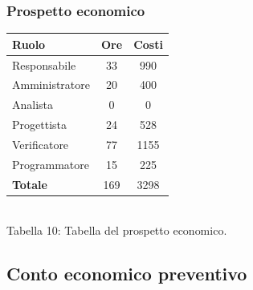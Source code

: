 \subsubsection{Prospetto economico}
\begin{center}
\begin{tabular}{| l | c | c |}
\hline
Ruolo & Ore & Costi \\
\hline
Responsabile & 33 & 990 \\
Amministratore & 20 & 400 \\
Analista & 0 & 0\\
Progettista & 24 & 528 \\
Verificatore & 77 & 1155 \\
Programmatore & 15 & 225 \\
\hline
\textbf{Totale} & 169 & 3298 \\
\hline
\end{tabular}
\\
Tabella 10: Tabella del prospetto economico.
\end{center}
\subsection{Conto economico preventivo}
